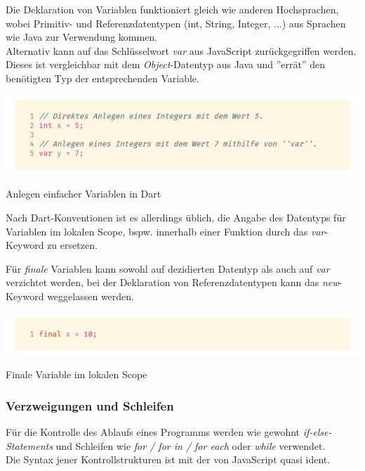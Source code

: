 Die Deklaration von Variablen funktioniert gleich wie anderen Hochsprachen,
wobei Primitiv- und Referenzdatentypen (int, String, Integer, ...) aus Sprachen wie Java zur Verwendung
kommen.\\
Alternativ kann auf das Schlüsselwort \textit{var} aus JavaScript zurückgegriffen werden. Dieses
ist vergleichbar mit dem \textit{Object}-Datentyp aus Java und ''errät'' den benötigten
Typ der entsprechenden Variable.

\begin{code}
    \centering
    \includegraphics[width=1\textwidth]{images/Dart/theory/dartVariables.png}
    \caption{Anlegen einfacher Variablen in Dart}
\end{code}

Nach Dart-Konventionen ist es allerdings üblich, die Angabe des Datentyps für Variablen 
im lokalen Scope, bspw. innerhalb einer Funktion durch das \textit{var}-Keyword zu ersetzen.

Für \textit{finale} Variablen kann sowohl auf dezidierten Datentyp als auch auf \textit{var} 
verzichtet werden, bei der Deklaration von Referenzdatentypen kann das \textit{new}-Keyword 
weggelassen werden.

\begin{code}
    \centering
    \includegraphics[width=1\textwidth]{images/Dart/theory/dartLocalFinal.png}
    \caption{Finale Variable im lokalen Scope}
\end{code}

\subsubsection{Verzweigungen und Schleifen}

Für die Kontrolle des Ablaufs eines Programms werden wie gewohnt \textit{if-else-Statements} und Schleifen
wie \textit{for / for in / for each} oder \textit{while} verwendet.\\
Die Syntax jener Kontrollstrukturen ist mit der von JavaScript quasi ident.

